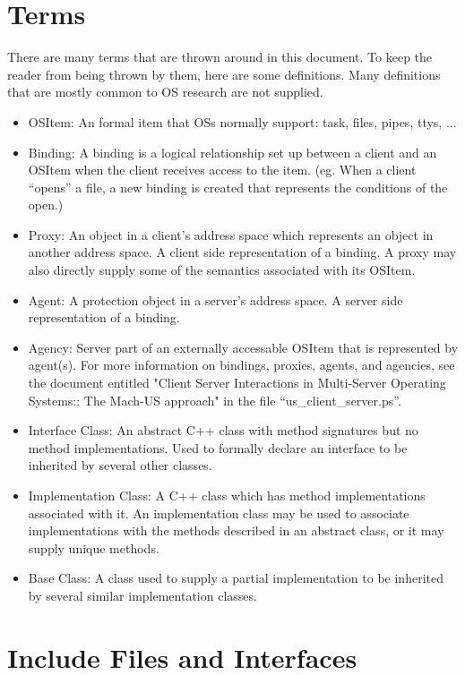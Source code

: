 \section{Terms}
There are many terms that are thrown around in this document.  To keep
the reader from being thrown by them, here are some definitions.
Many definitions that are mostly common to OS research are not supplied.
\begin{itemize}
\item{OSItem}: An formal item that OSs normally support:
task, files, pipes, ttys, ...
\item{Binding}: A binding is a logical relationship set up
between a client and an OSItem when the client receives access to the item.
(eg. When a client ``opens'' a file, a new binding is created that represents
the conditions of the open.)
\item{Proxy}: An object in a client's address space which represents an object
in another address space.  A client side representation of a binding.
A proxy may also directly supply some of the semantics associated with its
OSItem.
\item{Agent}: A protection object in a server's address space.
A server side representation of a binding.
\item{Agency}: Server part of an
externally accessable OSItem that is represented by
agent(s).
For more information on bindings,
proxies, agents, and agencies, see the document entitled
"Client Server Interactions in Multi-Server Operating Systems:: The Mach-US approach" in the file ``us\_client\_server.ps''.

\item{Interface Class}:  An abstract C++ class with method signatures but
no method implementations.  Used to formally declare an interface to
be inherited by several other classes.
\item{Implementation Class}: A C++ class which has method implementations
associated with it.  An implementation class may be used to associate
implementations with the methods described in an abstract class, or it may
supply unique methods.
\item{Base Class}: A class used to supply a partial implementation to be
inherited by several similar implementation classes.
{\MORE}
\end{itemize}

\section{Include Files and Interfaces}
\label{sec:tour-includes}
